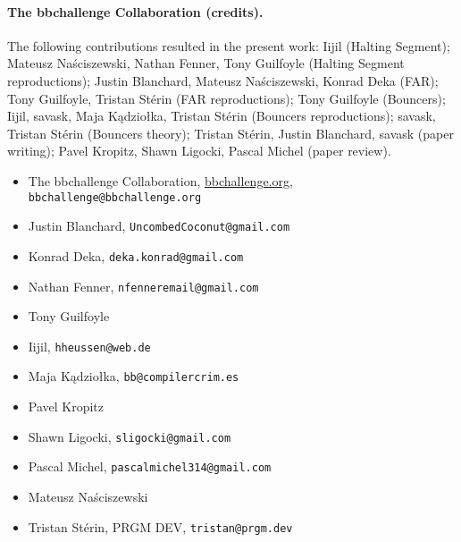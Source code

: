\documentclass[a4paper,british]{article}
\theoremstyle{definition} %
\numberwithin{equation}{section}
\theoremstyle{definition} %
\begin{document}
\paragraph{The bbchallenge Collaboration (credits).} The following contributions resulted in the present work: Iijil (Halting Segment); Mateusz Na\'{s}ciszewski, Nathan Fenner, Tony Guilfoyle (Halting Segment reproductions); Justin Blanchard, Mateusz Naściszewski, Konrad Deka (FAR); Tony Guilfoyle, Tristan Stérin (FAR reproductions); Tony Guilfoyle (Bouncers); Iijil, savask, Maja Kądziołka, Tristan Stérin (Bouncers reproductions); savask, Tristan Stérin (Bouncers theory); Tristan Stérin, Justin Blanchard, savask (paper writing); Pavel Kropitz, Shawn Ligocki, Pascal Michel (paper review).

\begin{itemize}
  \item The bbchallenge Collaboration, \url{bbchallenge.org}, \texttt{bbchallenge@bbchallenge.org}
  \item Justin Blanchard, \texttt{UncombedCoconut@gmail.com}
  \item Konrad Deka, \texttt{deka.konrad@gmail.com}
  \item Nathan Fenner, \texttt{nfenneremail@gmail.com}
  \item Tony Guilfoyle
  \item Iijil, \texttt{hheussen@web.de}
  \item Maja Kądziołka, \texttt{bb@compilercrim.es}
  \item Pavel Kropitz
  \item Shawn Ligocki, \texttt{sligocki@gmail.com}
  \item Pascal Michel, \texttt{pascalmichel314@gmail.com}
  \item Mateusz Na\'{s}ciszewski
  \item Tristan Stérin, PRGM DEV, \texttt{tristan@prgm.dev}
\end{itemize}




\end{document}

